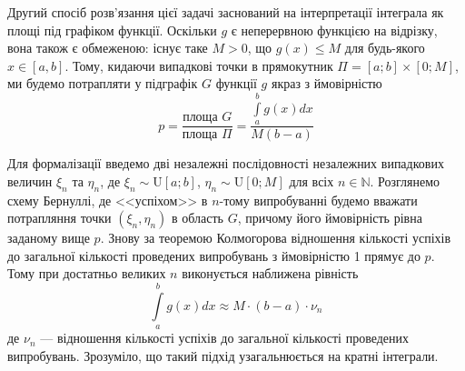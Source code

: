 Другий спосіб розв'язання цієї задачі заснований на інтерпретації інтеграла як площі під графіком функції. 
Оскільки $g$ є неперервною функцією на відрізку, вона також є обмеженою: існує таке $M>0$, що $g(x)\leq M$ для будь-якого $x\in[a,b]$.
Тому, кидаючи випадкові точки в прямокутник $\Pi=[a;b]\times[0;M]$, ми будемо потрапляти у підграфік $G$ функції $g$ якраз з ймовірністю
$$p=\frac{\text{площа $G$}}{\text{площа $\Pi$}}=
\frac{\int\limits_a^b g(x) dx}{M(b-a)}$$
\begin{center}
\end{center}
Для формалізації введемо дві незалежні послідовності незалежних випадкових величин $\xi_n$ та $\eta_n$, де 
$\xi_n \sim \mathrm{U}[a;b]$, $\eta_n \sim \mathrm{U}[0; M]$ для всіх $n\in\mathbb{N}$. Розглянемо схему Бернуллі, де 
<<успіхом>> в $n$-тому випробуванні будемо вважати потрапляння точки $(\xi_n, \eta_n)$ в область $G$, причому його ймовірність рівна
заданому вище $p$. Знову за теоремою Колмогорова відношення кількості успіхів до загальної кількості проведених випробувань з ймовірністю 1
прямує до $p$.
Тому при достатньо великих $n$ виконується наближена рівність
$$\int\limits_a^b g(x) dx\approx M \cdot(b-a)\cdot \nu_n$$
де $\nu_n$ --- відношення кількості успіхів до загальної кількості проведених випробувань.
Зрозуміло, що такий підхід узагальнюється на кратні інтеграли.